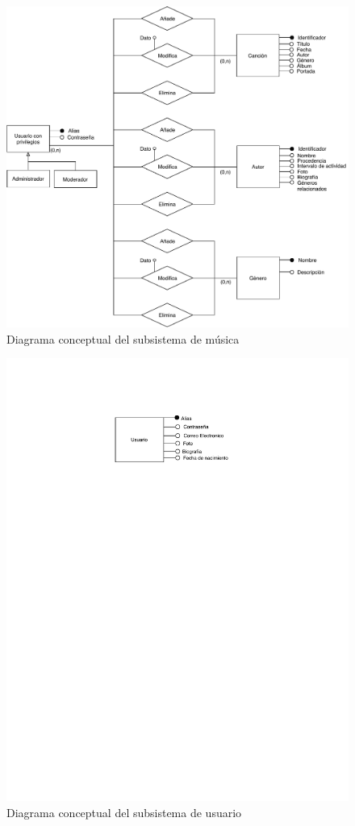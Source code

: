 \begin{figure}[H]
  \caption{Diagrama conceptual del subsistema de música}
  \centering
  \includegraphics[scale=0.8]{diagramas/musica-conceptual.pdf}
\end{figure}

\begin{figure}[H]
  \caption{Diagrama conceptual del subsistema de usuario}
  \centering
  \includegraphics{diagramas/conceptual-usuario.pdf}
\end{figure}

